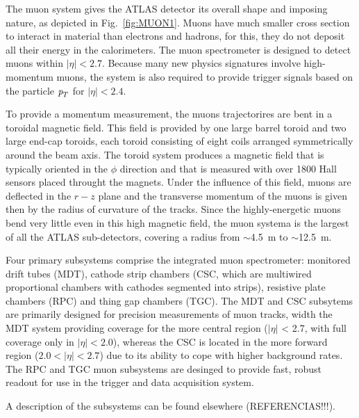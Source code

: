 The muon system gives the ATLAS detector its overall shape and imposing nature, as depicted in Fig.~\ref{fig:MUON1}.
Muons have much smaller cross section to interact in material than electrons and hadrons, for this, they 
do not deposit all their energy in the calorimeters. The muon spectrometer is designed to detect muons within $|\eta|<2.7$. Because many new physics signatures involve high-momentum muons, the system is also required to provide trigger signals based on the particle ${\emph{p}_{T}}$ for  $|\eta|<2.4$.

To provide a momentum measurement, the muons trajectorires are bent in a toroidal magnetic field. This field is provided by one large barrel toroid and two large end-cap toroids, each toroid consisting of eight coils arranged symmetrically around the beam axis.  The toroid system produces a magnetic field that is typically oriented in the $\phi$ direction and that is measured with over 1800 Hall sensors placed throught the magnets. Under the influence of this field, muons are deflected in the $r - z$ plane and the transverse momentum of the muons is given then by the radius of curvature of the tracks. Since the highly-energetic muons bend very little even in this high magnetic field, the muon systema is the largest of all the ATLAS sub-detectors, covering a radius from $\sim$4.5~m to $\sim$12.5~m.

Four  primary subsystems comprise the integrated muon spectrometer: monitored drift tubes (MDT), cathode strip chambers (CSC, which are multiwired proportional chambers with cathodes segmented into strips), resistive plate chambers (RPC) and thing gap chambers (TGC). The MDT and CSC subsytems are primarily designed for precision measurements of muon tracks, width the MDT system providing coverage for the more central region ($|\eta|$ < 2.7, with full coverage only in $|\eta| < 2.0$), whereas the CSC is located in the more forward region ($2.0 < |\eta| < 2.7$) due to its ability to cope with higher background rates. The RPC and TGC muon subsystems are desinged to provide fast, robust readout for use in the trigger and data acquisition system. 

A description of the subsystems can be found elsewhere (REFERENCIAS!!!).




